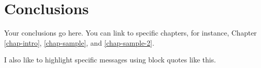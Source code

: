 \chapter[Conclusions]{Conclusions}\label{chap-conc}

Your conclusions go here. You can link to specific chapters, for instance, Chapter \ref{chap-intro}, \ref{chap-sample}, and \ref{chap-sample-2}.


\begin{center} 
\begin{quoteblock}
I also like to highlight specific messages using block quotes like this.
\end{quoteblock} 
\end{center}